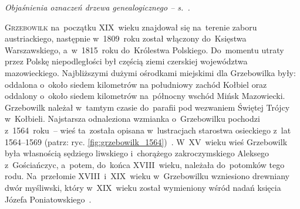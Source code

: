 \begin{center}
\end{center}

\par\medskip
{\footnotesize \emph{Objaśnienia oznaczeń drzewa genealogicznego --
s.~\pageref{legenda:drzewa}.}}

\newpage
\ifodd\value{page}\hbox{}\newpage\fi



{}

\lettrine{G}{rzebowilk} na~początku XIX~wieku znajdował się na~terenie zaboru
austriackiego, następnie w~1809~roku został włączony do~Księstwa
Warszawskiego, a~w~1815~roku do~Królestwa Polskiego. Do~momentu utraty przez
Polskę niepodległości był częścią ziemi czerskiej województwa mazowieckiego.
Najbliższymi dużymi ośrodkami miejskimi dla Grzebowilka były: oddalona o~około
siedem kilometrów na południowy zachód Kołbiel oraz oddalony o~około siedem
kilometrów na~północny wschód Mińsk Mazowiecki. Grzebowilk należał w~tamtym
czasie do~parafii pod wezwaniem Świętej Trójcy w~Kołbieli. Najstarsza
odnaleziona wzmianka o~Grzebowilku pochodzi z~1564~roku~-- wieś ta~została
opisana w~lustracjach starostwa osieckiego z~lat 1564--1569 (patrz: ryc.
\ref{fig:grzebowilk_1564})~\cite{agad2}. W~XV~wieku wieś Grzebowilk była
własnością sędziego liwskiego i~chorążego zakroczymskiego Aleksego
z~Gościańczyc, a~potem, do~końca XVIII~wieku, należała do~potomków tego rodu.
Na~przełomie XVIII~i~XIX~wieku w~Grzebowilku wzniesiono drewniany dwór
myśliwski, który w~XIX~wieku został wymieniony wśród nadań księcia Józefa
Poniatowskiego~\cite{klos}.

